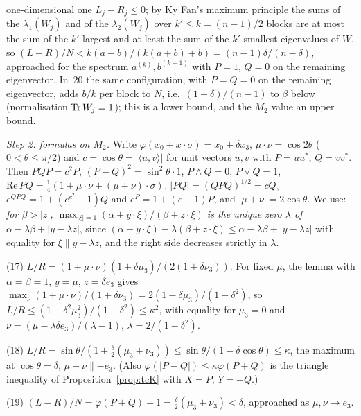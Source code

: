 one-dimensional one $L_j-R_j\le0$; by Ky Fan's maximum principle the sums of the $\lambda_1(W_j)$ and of the
$\lambda_2(W_j)$ over $k'\le k=(n-1)/2$ blocks are at most the sum of the $k'$ largest and at least the sum of the $k'$
smallest eigenvalues of $W$, so $(L-R)/N<k(a-b)/(k(a+b)+b)=(n-1)\delta/(n-\delta)$, approached for the spectrum
$a^{(k)},b^{(k+1)}$ with $P=1$, $Q=0$ on the remaining eigenvector. In~20 the same configuration, with $P=Q=0$ on the
remaining eigenvector, adds $b/k$ per block to $N$, i.e.\ $(1-\delta)/(n-1)$ to $\beta$ below (normalisation
$\operatorname{Tr} W_j=1$); this is a lower bound, and the $M_2$ value an upper bound.

\emph{Step 2: formulas on $M_2$.} Write $\varphi(x_0+x\cdot\sigma)=x_0+\delta x_3$, $\mu\cdot\nu=\cos2\theta$
($0<\theta\le\pi/2$) and $c=\cos\theta=|\langle u,v\rangle|$ for unit vectors $u,v$ with $P=uu^*$, $Q=vv^*$. Then
$PQP=c^2P$, $(P-Q)^2=\sin^2\theta\cdot1$, $P\wedge Q=0$, $P\vee Q=1$, $\mathrm{Re}\,PQ=\frac14(1+\mu\cdot\nu+(\mu+\nu)\cdot
\sigma)$, $|PQ|=(QPQ)^{1/2}=cQ$, $e^{QPQ}=1+(e^{c^2}-1)Q$ and $e^P=1+(e-1)P$, and $|\mu+\nu|=2\cos\theta$. We use:
\emph{for $\beta>|z|$, $\max_{|\xi|=1}(\alpha+y\cdot\xi)/(\beta+z\cdot\xi)$ is the unique zero $\lambda$ of
$\alpha-\lambda\beta+|y-\lambda z|$}, since $(\alpha+y\cdot\xi)-\lambda(\beta+z\cdot\xi)\le\alpha-\lambda\beta+|y-\lambda z|$
with equality for $\xi\parallel y-\lambda z$, and the right side decreases strictly in $\lambda$.

(17) $L/R=(1+\mu\cdot\nu)(1+\delta\mu_3)/(2(1+\delta\nu_3))$. For fixed $\mu$, the lemma with $\alpha=\beta=1$, $y=\mu$,
$z=\delta e_3$ gives $\max_\nu(1+\mu\cdot\nu)/(1+\delta\nu_3)=2(1-\delta\mu_3)/(1-\delta^2)$, so
$L/R\le(1-\delta^2\mu_3^2)/(1-\delta^2)\le\kappa^2$, with equality for $\mu_3=0$ and $\nu=(\mu-\lambda\delta e_3)/(\lambda-1)$,
$\lambda=2/(1-\delta^2)$.

(18) $L/R=\sin\theta/(1+\frac\delta2(\mu_3+\nu_3))\le\sin\theta/(1-\delta\cos\theta)\le\kappa$, the maximum at
$\cos\theta=\delta$, $\mu+\nu\parallel-e_3$. (Also $\varphi(|P-Q|)\le\kappa\varphi(P+Q)$ is the triangle inequality of
Proposition~\ref{prop:tcK} with $X=P$, $Y=-Q$.)

(19) $(L-R)/N=\varphi(P+Q)-1=\frac\delta2(\mu_3+\nu_3)<\delta$, approached as $\mu,\nu\to e_3$.

